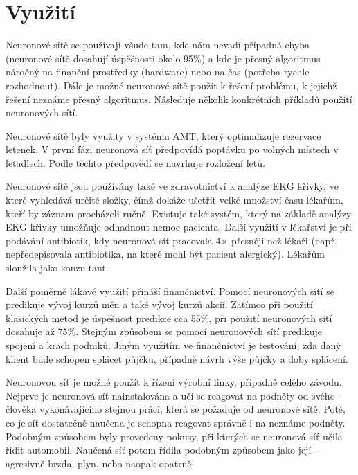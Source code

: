 \documentclass[11pt,twoside,a4paper]{book}
\begin{document}
\section{Využití}
Neuronové sítě se používají všude tam, kde nám nevadí případná chyba (neuronové sítě dosahují úspěšnosti okolo 95\%) a kde je přesný algoritmus náročný na finanční prostředky (hardware) nebo na čas (potřeba rychle rozhodnout). Dále je možné neuronové sítě použít k řešení problému, k jejichž řešení neznáme přesný algoritmus. Následuje několik konkrétních příkladů použití neuronových sítí.

Neuronové sítě byly využity v systému AMT, který optimalizuje rezervace letenek. V první fázi neuronová síť předpovídá poptávku po volných místech v letadlech. Podle těchto předpovědí se navrhuje rozložení letů.

Neuronové sítě jsou používány také ve zdravotnictví k analýze EKG křivky, ve které vyhledává určité složky, čímž dokáže ušetřit velké množství času lékařům, kteří by záznam procházeli ručně. Existuje také systém, který na základě analýzy EKG křivky umožňuje odhadnout nemoc pacienta. Další využití v lékařství je při podávání antibiotik, kdy neuronová síť pracovala 4\begin{math}\times\end{math} přesněji než lékaři (např. nepředepisovala antibiotika, na které mohl být pacient alergický). Lékařům sloužila jako konzultant.

Další poměrně lákavé využití přináší finančnictví. Pomocí neuronových sítí se predikuje vývoj kurzů měn a také vývoj kurzů akcií. Zatímco při použití klasických metod je úspěšnost predikce cca 55\%, při použití neuronových sítí dosahuje až 75\%. Stejným způsobem se pomocí neuronových sítí predikuje spojení a krach podniků. Jiným využitím ve finančnictví je testování, zda daný klient bude schopen splácet půjčku, případně návrh výše půjčky a doby splácení.

Neuronovou síť je možné použít k řízení výrobní linky, případně celého závodu. Nejprve je neuronová síť nainstalována a učí se reagovat na podněty od svého  - člověka vykonávajícího stejnou práci, která se požaduje od neuronové sítě. Poté, co je síť dostatečně naučena je schopna reagovat správně i na neznáme podněty. Podobným způsobem byly provedeny pokusy, při kterých se neuronová síť učila řídit automobil. Naučená síť potom řídila podobným způsobem jako její  - agresivně brzda, plyn, nebo naopak opatrně.\cite{kacenka}

\end{document}
